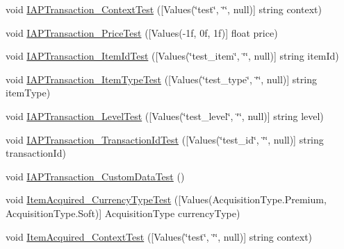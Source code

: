 \begin{DoxyCompactItemize}
\item 
void \mbox{\hyperlink{class_unity_engine_1_1_analytics_1_1_tests_1_1_analytics_event_tests_a9ef273baa081d85d9e651c3f3668650e}{I\+A\+P\+Transaction\+\_\+\+Context\+Test}} (\mbox{[}Values(\char`\"{}test\char`\"{}, \char`\"{}\char`\"{}, null)\mbox{]} string context)
\item 
void \mbox{\hyperlink{class_unity_engine_1_1_analytics_1_1_tests_1_1_analytics_event_tests_ad6d934091b1f41a3de4c35941579a44e}{I\+A\+P\+Transaction\+\_\+\+Price\+Test}} (\mbox{[}Values(-\/1f, 0f, 1f)\mbox{]} float price)
\item 
void \mbox{\hyperlink{class_unity_engine_1_1_analytics_1_1_tests_1_1_analytics_event_tests_a047702af2884cc70440d73571a29f86e}{I\+A\+P\+Transaction\+\_\+\+Item\+Id\+Test}} (\mbox{[}Values(\char`\"{}test\+\_\+item\char`\"{}, \char`\"{}\char`\"{}, null)\mbox{]} string item\+Id)
\item 
void \mbox{\hyperlink{class_unity_engine_1_1_analytics_1_1_tests_1_1_analytics_event_tests_a138b8789fd0277ab323ee67d171141e0}{I\+A\+P\+Transaction\+\_\+\+Item\+Type\+Test}} (\mbox{[}Values(\char`\"{}test\+\_\+type\char`\"{}, \char`\"{}\char`\"{}, null)\mbox{]} string item\+Type)
\item 
void \mbox{\hyperlink{class_unity_engine_1_1_analytics_1_1_tests_1_1_analytics_event_tests_a519fcc2f47aaae37231255d8c4dbf761}{I\+A\+P\+Transaction\+\_\+\+Level\+Test}} (\mbox{[}Values(\char`\"{}test\+\_\+level\char`\"{}, \char`\"{}\char`\"{}, null)\mbox{]} string level)
\item 
void \mbox{\hyperlink{class_unity_engine_1_1_analytics_1_1_tests_1_1_analytics_event_tests_a9a292322c9fc08b516000291580482b4}{I\+A\+P\+Transaction\+\_\+\+Transaction\+Id\+Test}} (\mbox{[}Values(\char`\"{}test\+\_\+id\char`\"{}, \char`\"{}\char`\"{}, null)\mbox{]} string transaction\+Id)
\item 
void \mbox{\hyperlink{class_unity_engine_1_1_analytics_1_1_tests_1_1_analytics_event_tests_a4458ced6de6579a40d80cfb8c3dfc25f}{I\+A\+P\+Transaction\+\_\+\+Custom\+Data\+Test}} ()
\item 
void \mbox{\hyperlink{class_unity_engine_1_1_analytics_1_1_tests_1_1_analytics_event_tests_a578fe56b21f842139eabffdb46bfd751}{Item\+Acquired\+\_\+\+Currency\+Type\+Test}} (\mbox{[}Values(Acquisition\+Type.\+Premium, Acquisition\+Type.\+Soft)\mbox{]} Acquisition\+Type currency\+Type)
\item 
void \mbox{\hyperlink{class_unity_engine_1_1_analytics_1_1_tests_1_1_analytics_event_tests_a5a9b414d1c142a2a04089c335c1545e0}{Item\+Acquired\+\_\+\+Context\+Test}} (\mbox{[}Values(\char`\"{}test\char`\"{}, \char`\"{}\char`\"{}, null)\mbox{]} string context)

\end{DoxyCompactItemize}
